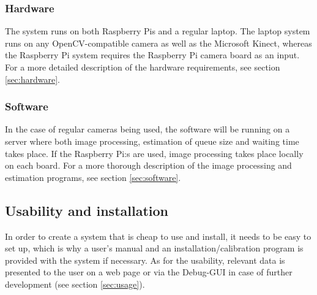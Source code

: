 \subsubsection{Hardware}
The system runs on both Raspberry Pis and a regular laptop. The laptop system runs on any OpenCV-compatible camera as well as the Microsoft Kinect, whereas the Raspberry Pi system requires the Raspberry Pi camera board as an input. For a more detailed description of the hardware requirements, see section \ref{sec:hardware}.

\subsubsection{Software}
In the case of regular cameras being used, the software will be running on a server where both image processing, estimation of queue size and waiting time takes place. If the Raspberry Pi:s are used, image processing takes place locally on each board. For a more thorough description of the image processing and estimation programs, see section \ref{sec:software}.

\subsection{Usability and installation}
In order to create a system that is cheap to use and install, it needs to be easy to set up, which is why a user's manual and an installation/calibration program is provided with the system if necessary. As for the usability, relevant data is presented to the user on a web page or via the Debug-GUI in case of further development (see section \ref{sec:usage}). 

